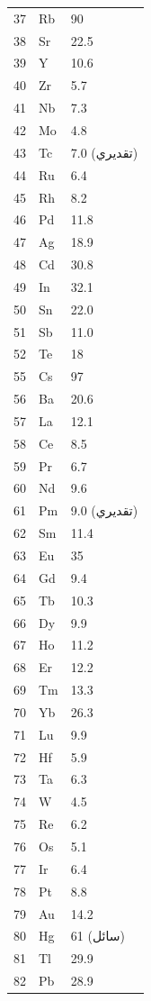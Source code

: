 \documentclass[11pt,a4paper]{article}
\begin{document}
\begin{otherlanguage}{arabic}
\begin{longtable}{p{0.6cm}p{1.2cm}p{1.5cm}}
			37 & Rb & 90 \\
			38 & Sr & 22.5 \\
			39 & Y  & 10.6 \\
			40 & Zr & 5.7 \\
			41 & Nb & 7.3 \\
			42 & Mo & 4.8 \\
			43 & Tc & 7.0 (تقديري) \\
			44 & Ru & 6.4 \\
			45 & Rh & 8.2 \\
			46 & Pd & 11.8 \\
			47 & Ag & 18.9 \\
			48 & Cd & 30.8 \\
			49 & In & 32.1 \\
			50 & Sn & 22.0 \\
			51 & Sb & 11.0 \\
			52 & Te & 18 \\
			55 & Cs & 97 \\
			56 & Ba & 20.6 \\
			57 & La & 12.1 \\
			58 & Ce & 8.5 \\
			59 & Pr & 6.7 \\
			60 & Nd & 9.6 \\
			61 & Pm & 9.0 (تقديري) \\
			62 & Sm & 11.4 \\
			63 & Eu & 35 \\
			64 & Gd & 9.4 \\
			65 & Tb & 10.3 \\
			66 & Dy & 9.9 \\
			67 & Ho & 11.2 \\
			68 & Er & 12.2 \\
			69 & Tm & 13.3 \\
			70 & Yb & 26.3 \\
			71 & Lu & 9.9 \\
			72 & Hf & 5.9 \\
			73 & Ta & 6.3 \\
			74 & W  & 4.5 \\
			75 & Re & 6.2 \\
			76 & Os & 5.1 \\
			77 & Ir & 6.4 \\
			78 & Pt & 8.8 \\
			79 & Au & 14.2 \\
			80 & Hg & 61 (سائل) \\
			81 & Tl & 29.9 \\
			82 & Pb & 28.9 \\
		\end{longtable}
		

\end{otherlanguage}
\end{document}
